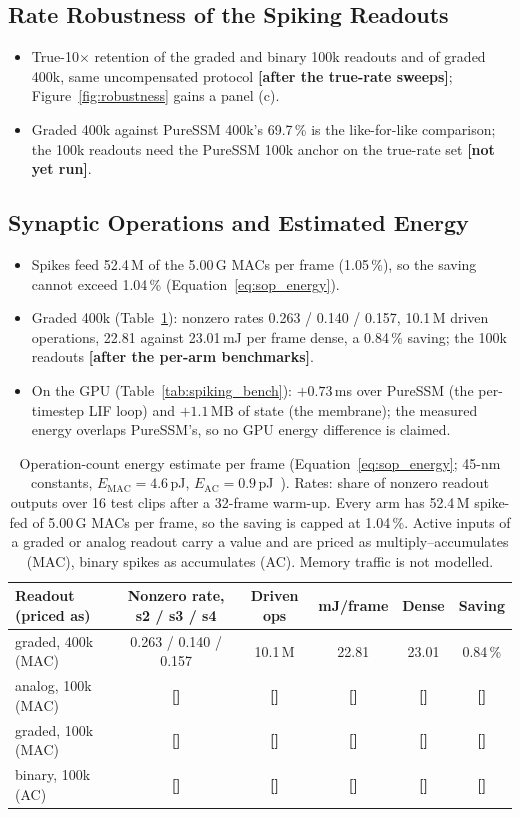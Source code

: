 \documentclass[11pt, a4paper]{report}
\newcommand{\res}[1]{{\color{red}\textbf{[#1]}}}
\begin{document}
\subsection{Rate Robustness of the Spiking Readouts}
\label{subsec:spk_rate}
\begin{itemize}
  \item True-10$\times$ retention of the graded and binary 100k readouts and of graded 400k, same uncompensated protocol \res{after the true-rate sweeps}; Figure~\ref{fig:robustness} gains a panel (c).
  \item Graded 400k against PureSSM 400k's 69.7\,\% is the like-for-like comparison; the 100k readouts need the PureSSM 100k anchor on the true-rate set \res{not yet run}.
\end{itemize}

\subsection{Synaptic Operations and Estimated Energy}
\label{subsec:spk_energy}
\begin{itemize}
  \item Spikes feed 52.4\,M of the 5.00\,G MACs per frame (1.05\,\%), so the saving cannot exceed 1.04\,\% (Equation~\eqref{eq:sop_energy}).
  \item Graded 400k (Table~\ref{tab:sop}): nonzero rates 0.263 / 0.140 / 0.157, 10.1\,M driven operations, 22.81 against 23.01\,mJ per frame dense, a 0.84\,\% saving; the 100k readouts \res{after the per-arm benchmarks}.
  \item On the GPU (Table~\ref{tab:spiking_bench}): $+0.73$\,ms over PureSSM (the per-timestep LIF loop) and $+1.1$\,MB of state (the membrane); the measured energy overlaps PureSSM's, so no GPU energy difference is claimed.
\end{itemize}
\begin{table}[htbp]
\centering
\caption{Operation-count energy estimate per frame (Equation~\eqref{eq:sop_energy}; 45-nm constants,
$E_{\mathrm{MAC}} = 4.6$\,pJ, $E_{\mathrm{AC}} = 0.9$\,pJ~\cite{horowitz2014computing}). Rates: share of nonzero
readout outputs over 16 test clips after a 32-frame warm-up. Every arm has 52.4\,M spike-fed of 5.00\,G MACs
per frame, so the saving is capped at 1.04\,\%. Active inputs of a graded or analog readout carry a value and
are priced as multiply--accumulates (MAC), binary spikes as accumulates (AC). Memory traffic is not modelled.}
\label{tab:sop}
\small
\setlength{\tabcolsep}{3.5pt}
\begin{tabular}{lccccc}
\toprule
\textbf{Readout (priced as)} & \textbf{Nonzero rate, s2 / s3 / s4} & \textbf{Driven ops} & \textbf{mJ/frame} & \textbf{Dense} & \textbf{Saving} \\
\midrule
graded, 400k (MAC) & 0.263 / 0.140 / 0.157 & 10.1\,M & 22.81 & 23.01 & 0.84\,\% \\
analog, 100k (MAC) & \res{} & \res{} & \res{} & \res{} & \res{} \\
graded, 100k (MAC) & \res{} & \res{} & \res{} & \res{} & \res{} \\
binary, 100k (AC)  & \res{} & \res{} & \res{} & \res{} & \res{} \\
\bottomrule
\end{tabular}
\end{table}
\end{document}
